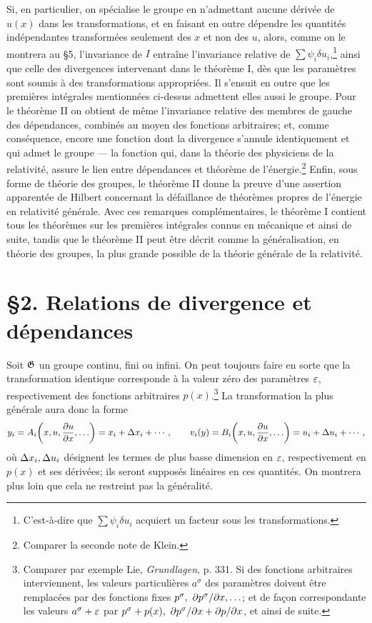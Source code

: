 Si, en particulier, on spécialise le groupe en n'admettant aucune dérivée de \(u(x)\) dans les transformations, et en faisant en outre dépendre les quantités indépendantes transformées seulement des \(x\) et non des \(u\), alors, comme on le montrera au \S{}5, l'invariance de \(I\) entraîne l'invariance relative de \(\sum\psi_i\delta u_i\),\footnote{C'est-à-dire que \(\sum\psi_i\delta u_i\) acquiert un facteur sous les transformations.} ainsi que celle des divergences intervenant dans le théorème I, dès que les paramètres sont soumis à des transformations appropriées. Il s'ensuit en outre que les premières intégrales mentionnées ci-dessus admettent elles aussi le groupe. Pour le théorème II on obtient de même l'invariance relative des membres de gauche des dépendances, combinés au moyen des fonctions arbitraires; et, comme conséquence, encore une fonction dont la divergence s'annule identiquement et qui admet le groupe --- la fonction qui, dans la théorie des physiciens de la relativité, assure le lien entre dépendances et théorème de l'énergie.\footnote{Comparer la seconde note de Klein.} Enfin, sous forme de théorie des groupes, le théorème II donne la preuve d'une assertion apparentée de Hilbert concernant la défaillance de théorèmes propres de l'énergie en \og{}relativité générale\fg{}. Avec ces remarques complémentaires, le théorème I contient tous les théorèmes sur les premières intégrales connus en mécanique et ainsi de suite, tandis que le théorème II peut être décrit comme la généralisation, en théorie des groupes, la plus grande possible de la \og{}théorie générale de la relativité\fg{}.

\section*{\S{}2. Relations de divergence et dépendances}

Soit \(\mathfrak G\) un groupe continu, fini ou infini. On peut toujours faire en sorte que la transformation identique corresponde à la valeur zéro des paramètres \(\varepsilon\), respectivement des fonctions arbitraires \(p(x)\).\footnote{Comparer par exemple Lie, \emph{Grundlagen}, p. 331. Si des fonctions arbitraires interviennent, les valeurs particulières \(a^\sigma\) des paramètres doivent être remplacées par des fonctions fixes \(p^\sigma,\ \partial p^\sigma/\partial x,\ldots\); et de façon correspondante les valeurs \(a^\sigma+\varepsilon\) par \(p^\sigma+p(x),\ \partial p^\sigma/\partial x+\partial p/\partial x\), et ainsi de suite.} La transformation la plus générale aura donc la forme
\[
y_i=A_i\!\left(x,u,\frac{\partial u}{\partial x},\ldots\right)=x_i+\Delta x_i+\cdots,\qquad
v_i(y)=B_i\!\left(x,u,\frac{\partial u}{\partial x},\ldots\right)=u_i+\Delta u_i+\cdots,
\]
où \(\Delta x_i,\Delta u_i\) désignent les termes de plus basse dimension en \(\varepsilon\), respectivement en \(p(x)\) et ses dérivées; ils seront supposés linéaires en ces quantités. On montrera plus loin que cela ne restreint pas la généralité.

